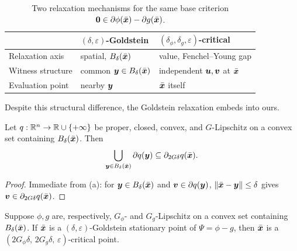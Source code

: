 \begin{table}[t]
\centering
\caption{Two relaxation mechanisms for the same base criterion
$\bm{0}\in\partial\phi(\bar{\bm{x}})-\partial g(\bar{\bm{x}})$.}
\label{tab:goldstein-vs-ours}
\small
\begin{tabular}{lll}
\hline
 & $(\delta,\varepsilon)$-Goldstein & $(\delta_\phi,\delta_g,\varepsilon)$-critical \\
\hline
Relaxation axis & spatial, $B_\delta(\bar{\bm{x}})$ & value, Fenchel--Young gap \\
Witness structure & common $\bm{y}\in B_\delta(\bar{\bm{x}})$ & independent $\bm{u},\bm{v}$ at $\bar{\bm{x}}$ \\
Evaluation point & nearby $\bm{y}$ & $\bar{\bm{x}}$ itself \\
\hline
\end{tabular}
\end{table}

Despite this structural difference, the Goldstein relaxation embeds into
ours.

\begin{lemma}
\label{cor:goldstein-bridge}
Let $q:\mathbb{R}^n\to\mathbb{R}\cup\{+\infty\}$ be proper, closed, convex, and
$G$-Lipschitz on a convex set containing $B_\delta(\bar{\bm{x}})$. Then
\[
    \bigcup_{\bm{y}\in B_\delta(\bar{\bm{x}})}\partial q(\bm{y})
    \subseteq
    \partial_{2G\delta}q(\bar{\bm{x}}).
\]
\end{lemma}

\begin{proof}
Immediate from (a): for $\bm{y}\in B_\delta(\bar{\bm{x}})$
and $\bm{v}\in\partial q(\bm{y})$, $\|\bar{\bm{x}}-\bm{y}\|\le\delta$ gives
$\bm{v}\in\partial_{2G\delta}q(\bar{\bm{x}})$.
\end{proof}

\begin{proposition}
\label{prop:goldstein-implies-ours}
Suppose $\phi,g$ are, respectively, $G_\phi$- and $G_g$-Lipschitz on a
convex set containing $B_\delta(\bar{\bm{x}})$. If $\bar{\bm{x}}$ is a
$(\delta,\varepsilon)$-Goldstein stationary point of $\Psi=\phi-g$, then
$\bar{\bm{x}}$ is a $(2G_\phi\delta,\,2G_g\delta,\,\varepsilon)$-critical point.
\end{proposition}

